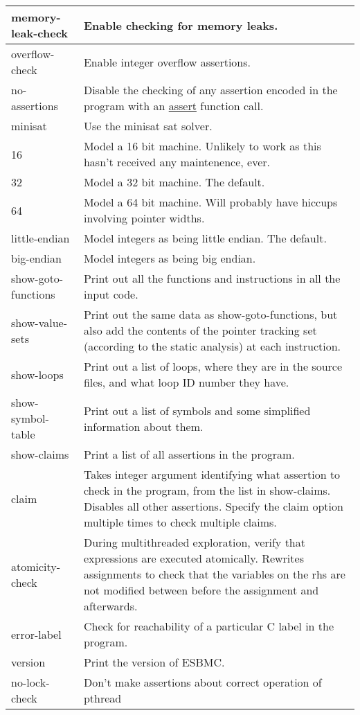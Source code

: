 \documentclass{article}
\begin{document}
\begin{table*}[ht]
\begin{tabularx}{\linewidth}{|l|X|}
\hline
memory-leak-check & Enable checking for memory leaks.\\
\hline
overflow-check & Enable integer overflow assertions.\\
\hline
no-assertions & Disable the checking of any assertion encoded in the program
with an \url{assert} function call.\\
\hline
minisat & Use the minisat sat solver.\\
\hline
16 & Model a 16 bit machine. Unlikely to work as this hasn't received any
maintenence, ever.\\
\hline
32 & Model a 32 bit machine. The default.\\
\hline
64 & Model a 64 bit machine. Will probably have hiccups involving pointer
widths.\\
\hline
little-endian & Model integers as being little endian. The default.\\
\hline
big-endian & Model integers as being big endian.\\
\hline
show-goto-functions & Print out all the functions and instructions in all the
input code.\\
\hline
show-value-sets & Print out the same data as show-goto-functions, but also
add the contents of the pointer tracking set (according to the static analysis)
at each instruction.\\
\hline
show-loops & Print out a list of loops, where they are in the source files,
and what loop ID number they have.\\
\hline
show-symbol-table & Print out a list of symbols and some simplified
information about them.\\
\hline
show-claims & Print a list of all assertions in the program.\\
\hline
claim & Takes integer argument identifying what assertion to check in the
program, from the list in show-claims. Disables all other assertions. Specify
the claim option multiple times to check multiple claims.\\ 
\hline
atomicity-check & During multithreaded exploration, verify that expressions
are executed atomically. Rewrites assignments to check that the variables on the
rhs are not modified between before the assignment and afterwards.\\
\hline
error-label & Check for reachability of a particular C label in the program.\\
\hline
version & Print the version of ESBMC.\\
\hline
no-lock-check & Don't make assertions about correct operation of pthread

\end{tabularx}
\end{table*}
\end{document}
